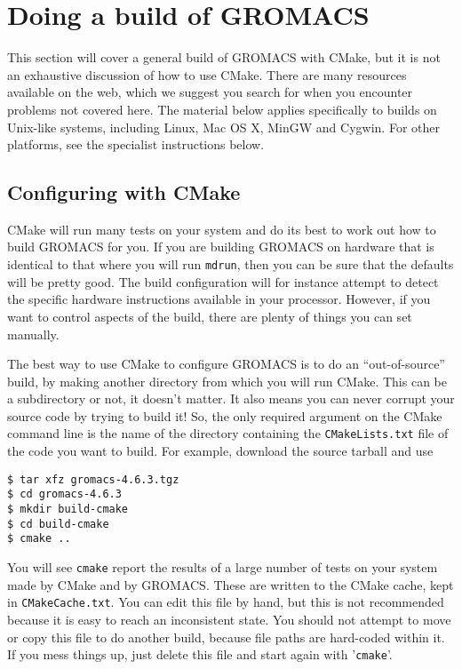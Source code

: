 \documentclass{article}[12pt,a4paper,twoside]
\newcommand{\gromacs}{GROMACS}
\newcommand{\cmake}{CMake}
\begin{document}
\section{Doing a build of \gromacs}

This section will cover a general build of \gromacs{} with \cmake{},
but it is not an exhaustive discussion of how to use \cmake{}. There
are many resources available on the web, which we suggest you search
for when you encounter problems not covered here. The material below
applies specifically to builds on Unix-like systems, including Linux,
Mac OS X, MinGW and Cygwin. For other platforms, see the specialist
instructions below.

\subsection{Configuring with \cmake{}}

\cmake{} will run many tests on your system and do its best to work
out how to build \gromacs{} for you. If you are building \gromacs{} on
hardware that is identical to that where you will run \verb+mdrun+,
then you can be sure that the defaults will be pretty good. The build
configuration will for instance attempt to detect the specific hardware
instructions available in your processor. However, if
you want to control aspects of the build, there are plenty of things you
can set manually.

The best way to use \cmake{} to configure \gromacs{} is to do an
``out-of-source'' build, by making another directory from which you
will run \cmake{}. This can be a subdirectory or not, it doesn't
matter. It also means you can never corrupt your source code by trying
to build it! So, the only required argument on the \cmake{} command
line is the name of the directory containing the
\verb+CMakeLists.txt+ file of the code you want to build. For
example, download the source tarball and use
\begin{verbatim}
$ tar xfz gromacs-4.6.3.tgz
$ cd gromacs-4.6.3
$ mkdir build-cmake
$ cd build-cmake
$ cmake ..
\end{verbatim}

You will see \verb+cmake+ report the results of a large number of
tests on your system made by \cmake{} and by \gromacs{}. These are
written to the \cmake{} cache, kept in \verb+CMakeCache.txt+. You
can edit this file by hand, but this is not recommended because it is
easy to reach an inconsistent state. You should not attempt to move or
copy this file to do another build, because file paths are hard-coded
within it. If you mess things up, just delete this file and start
again with '\verb+cmake+'.
\end{document}
